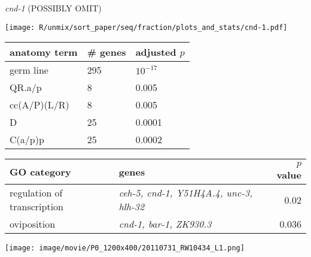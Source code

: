 \documentclass[serif,9pt]{beamer}
\begin{document}
\begin{frame}{{\em cnd-1} (POSSIBLY OMIT)}
\begin{minipage}{0.4\textwidth}
\texttt{[image: R/unmix/sort\_paper/seq/fraction/plots\_and\_stats/cnd-1.pdf]}
\end{minipage}
\begin{minipage}{0.58\textwidth}
\begin{table}[!tbp]\scriptsize
\begin{tabular}{lll}
anatomy term & \# genes & adjusted $p$ \\
\hline
germ line & 295 & $10^{-17}$ \\
QR.a/p & 8 & 0.005 \\
cc(A/P)(L/R) & 8 & 0.005 \\
D & 25 & 0.0001 \\
C(a/p)p & 25 & 0.0002 
\end{tabular}
\end{table}
\end{minipage}

\begin{table}\footnotesize
\begin{tabular}{llr}
GO category & genes & $p$ value \\
\hline
regulation of transcription & {\em ceh-5, cnd-1, Y51H4A.4, unc-3, hlh-32} & 0.02 \\
oviposition & {\em cnd-1, bar-1, ZK930.3} & 0.036 \\
\end{tabular}
\end{table}

\texttt{[image: image/movie/P0\_1200x400/20110731\_RW10434\_L1.png]}

\end{frame}
\end{document}
